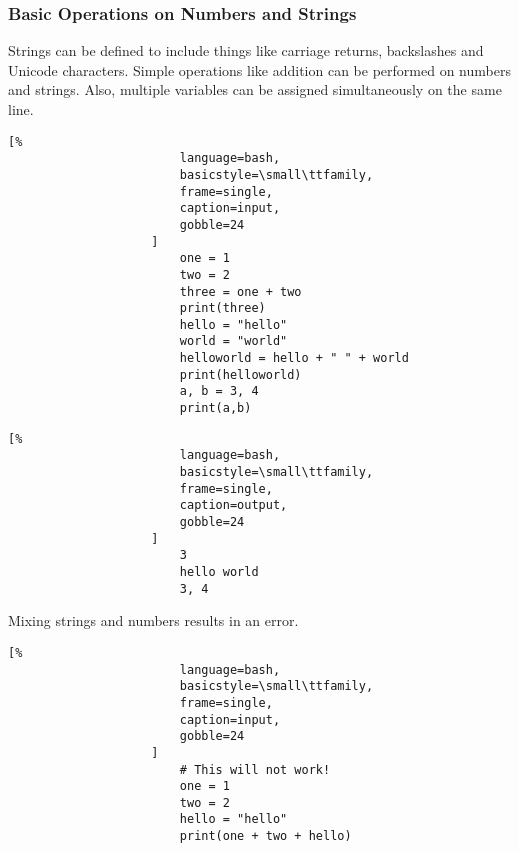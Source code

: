\documentclass[crop=false,class=book]{standalone}
\begin{document}
            \subsubsection{Basic Operations on Numbers and Strings}
                Strings can be defined to include things like
                carriage returns, backslashes and Unicode characters.
                Simple operations like addition can be performed on
                numbers and strings. Also, multiple variables can be
                assigned simultaneously on the same line.\newline
                \begin{minipage}[t]{.48\textwidth}
                    \centering
                    \begin{lstlisting}[%
                        language=bash,
                        basicstyle=\small\ttfamily,
                        frame=single,
                        caption=input,
                        gobble=24
                    ]
                        one = 1
                        two = 2
                        three = one + two
                        print(three)
                        hello = "hello"
                        world = "world"
                        helloworld = hello + " " + world
                        print(helloworld)
                        a, b = 3, 4
                        print(a,b)
                    \end{lstlisting}
                \end{minipage}\hfill
                \begin{minipage}[t]{.48\textwidth}
                    \centering
                    \begin{lstlisting}[%
                        language=bash,
                        basicstyle=\small\ttfamily,
                        frame=single,
                        caption=output,
                        gobble=24
                    ]
                        3
                        hello world
                        3, 4
                    \end{lstlisting}
                \end{minipage}
                Mixing strings and numbers results in
                an error.\newline
                \begin{minipage}[t]{.48\textwidth}
                    \centering
                    \begin{lstlisting}[%
                        language=bash,
                        basicstyle=\small\ttfamily,
                        frame=single,
                        caption=input,
                        gobble=24
                    ]
                        # This will not work!
                        one = 1
                        two = 2
                        hello = "hello"
                        print(one + two + hello)
                    \end{lstlisting}
                \end{minipage}\hfill
\end{document}
